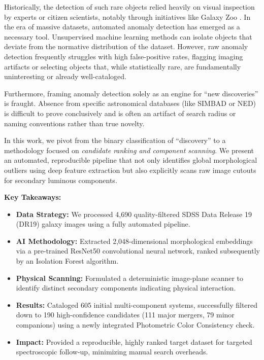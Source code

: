 \documentclass[twocolumn]{aastex631}
\begin{document}
Historically, the detection of such rare objects relied heavily on visual inspection by experts or citizen scientists, notably through initiatives like Galaxy Zoo \citep{lintott2008}. In the era of massive datasets, automated anomaly detection has emerged as a necessary tool. Unsupervised machine learning methods can isolate objects that deviate from the normative distribution of the dataset. However, raw anomaly detection frequently struggles with high false-positive rates, flagging imaging artifacts or selecting objects that, while statistically rare, are fundamentally uninteresting or already well-cataloged.

Furthermore, framing anomaly detection solely as an engine for ``new discoveries'' is fraught. Absence from specific astronomical databases (like SIMBAD or NED) is difficult to prove conclusively and is often an artifact of search radius or naming conventions rather than true novelty. 

In this work, we pivot from the binary classification of ``discovery'' to a methodology focused on \textit{candidate ranking and component scanning}. We present an automated, reproducible pipeline that not only identifies global morphological outliers using deep feature extraction but also explicitly scans raw image cutouts for secondary luminous components. 

\textbf{Key Takeaways:}
\begin{itemize}
    \item \textbf{Data Strategy:} We processed 4,690 quality-filtered SDSS Data Release 19 (DR19) galaxy images using a fully automated pipeline.
    \item \textbf{AI Methodology:} Extracted 2,048-dimensional morphological embeddings via a pre-trained ResNet50 convolutional neural network, ranked subsequently by an Isolation Forest algorithm.
    \item \textbf{Physical Scanning:} Formulated a deterministic image-plane scanner to identify distinct secondary components indicating physical interaction.
    \item \textbf{Results:} Cataloged 605 initial multi-component systems, successfully filtered down to 190 high-confidence candidates (111 major mergers, 79 minor companions) using a newly integrated Photometric Color Consistency check.
    \item \textbf{Impact:} Provided a reproducible, highly ranked target dataset for targeted spectroscopic follow-up, minimizing manual search overheads.
\end{itemize}
\end{document}
